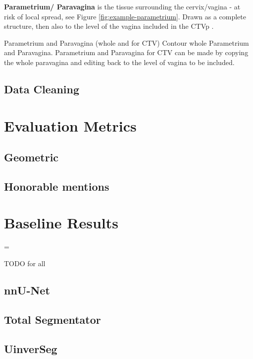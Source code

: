 \documentclass[11pt,twoside]{report}
\newenvironment{warning}
  {\par\begin{mdframed}[linewidth=1pt,linecolor=black]%
    \begin{list}{}{\leftmargin=1cm
                   \labelwidth=\leftmargin}\item[\Large\ding{43}]}
  {\end{list}\end{mdframed}\par}
\begin{document}
\textbf{Parametrium/ Paravagina} is the tissue surrounding the cervix/vagina - at risk of local spread, see Figure \ref{fig:example-parametrium}. Drawn as a complete structure, then also to the level of the vagina included in the CTVp \cite{AMLART-data}.

Parametrium and Paravagina (whole and for CTV)  Contour whole Parametrium and Paravagina. Parametrium and Paravagina for CTV can be made by copying the whole paravagina and editing back to the level of vagina to be included.

\subsection{Data Cleaning}\label{sect:data-cleaning}

\section{Evaluation Metrics}\label{sect:evaluation-metrics}

\subsection{Geometric}\label{sect:geometric}

\subsection{Honorable mentions}\label{sect:evaluation-metrics-honorable-mentions}

\section{Baseline Results}\label{sect:baseline-results}

\begin{warning}
  TODO for all
\end{warning}

\subsection{nnU-Net}\label{sect:results-nnu-net}

\subsection{Total Segmentator}\label{sect:results-totalseg}

\subsection{UinverSeg}\label{sect:results-universeg}
\end{document}
